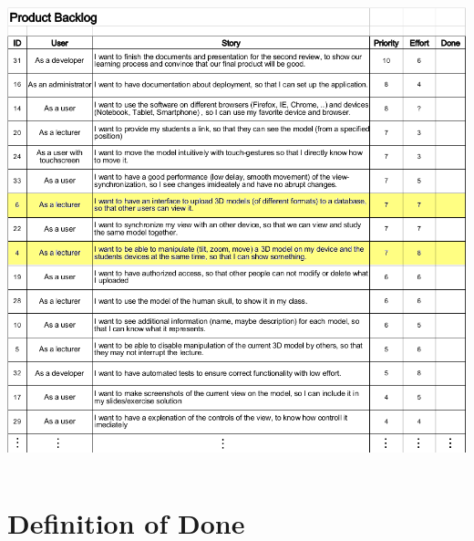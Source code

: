 \begin{frame}
\begin{columns}
    \begin{column}{0.7\textwidth}
      \includegraphics[width=.9\textwidth]{images/product-backlog.png}
    \end{column}
  \end{columns}
\end{frame}


\section{Definition of Done}

